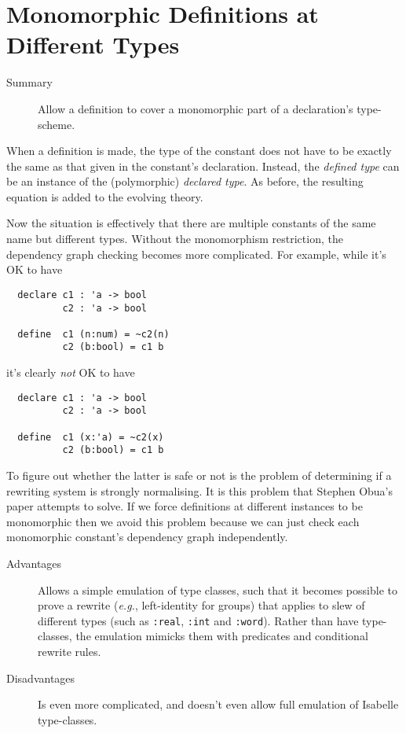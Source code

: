 \documentclass[11pt]{article}
\begin{document}
\section{Monomorphic Definitions at Different Types}
\label{sec:defin-at-diff}

\begin{description}
\item[Summary] Allow a definition to cover a monomorphic part of a
  declaration's type-scheme.
\end{description}

When a definition is made, the type of the constant does not have to
be exactly the same as that given in the constant's declaration.
Instead, the \emph{defined type} can be an instance of the
(polymorphic) \emph{declared type}.  As before, the resulting equation
is added to the evolving theory.

Now the situation is effectively that there are multiple constants of
the same name but different types.  Without the monomorphism
restriction, the dependency graph checking becomes more complicated.
For example, while it's OK to have
\begin{verbatim}
  declare c1 : 'a -> bool
          c2 : 'a -> bool

  define  c1 (n:num) = ~c2(n)
          c2 (b:bool) = c1 b
\end{verbatim}
it's clearly \emph{not} OK to have
\begin{verbatim}
  declare c1 : 'a -> bool
          c2 : 'a -> bool

  define  c1 (x:'a) = ~c2(x)
          c2 (b:bool) = c1 b
\end{verbatim}

To figure out whether the latter is safe or not is the problem of
determining if a rewriting system is strongly normalising.  It is this
problem that Stephen Obua's paper attempts to solve.  If we force
definitions at different instances to be monomorphic then we avoid
this problem because we can just check each monomorphic constant's
dependency graph independently.

\begin{description}
\item[Advantages] Allows a simple emulation of type classes, such that
  it becomes possible to prove a rewrite (\emph{e.g.}, left-identity
  for groups) that applies to slew of different types (such as
  \texttt{:real}, \texttt{:int} and \texttt{:word}).  Rather than have
  type-classes, the emulation mimicks them with predicates and
  conditional rewrite rules.
\item[Disadvantages] Is even more complicated, and doesn't even allow
  full emulation of Isabelle type-classes.
\end{description}
\end{document}
